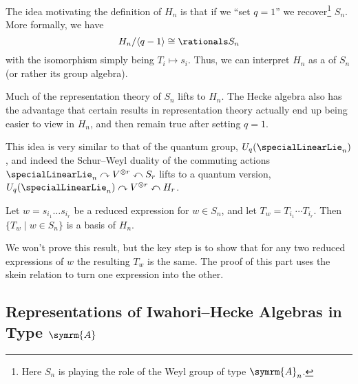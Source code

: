 \documentclass[fleqn]{NotesClass}
\newcommand{\isomorphic}{\cong}
\newcommand{\dynkin}[2]{\symrm{#1}_{#2}}
\begin{document}
    The idea motivating the definition of \(H_n\) is that if we \enquote{set \(q = 1\)} we recover\footnote{Here \(S_n\) is playing the role of the Weyl group of type \(\dynkin{A}{n}\).} \(S_n\).
    More formally, we have
    \begin{equation}
        H_n / \langle q - 1 \rangle \isomorphic \rationals S_n
    \end{equation}
    with the isomorphism simply being \(T_i \mapsto s_i\).
    Thus, we can interpret \(H_n\) as a  of \(S_n\) (or rather its group algebra).
    
    Much of the representation theory of \(S_n\) lifts to \(H_n\).
    The Hecke algebra also has the advantage that certain results in representation theory actually end up being easier to view in \(H_n\), and then remain true after setting \(q = 1\).
    
    This idea is very similar to that of the quantum group, \(U_q(\specialLinearLie_n)\), and indeed the Schur--Weyl duality of the commuting actions \(\specialLinearLie_n \curvearrowright V^{\otimes r} \curvearrowleft S_r\) lifts to a quantum version, \(U_q(\specialLinearLie_n) \curvearrowright V^{\otimes r} \curvearrowleft H_r\).
    
    \begin{prp}{}{}
        Let \(w = s_{i_1} \dotsc s_{i_r}\) be a reduced expression for \(w \in S_n\), and let \(T_w = T_{i_1} \dotsm T_{i_r}\).
        Then \(\{T_w \mid w \in S_n\}\) is a basis of \(H_n\).
    \end{prp}
    
    We won't prove this result, but the key step is to show that for any two reduced expressions of \(w\) the resulting \(T_w\) is the same.
    The proof of this part uses the skein relation to turn one expression into the other.
    
    \subsection{Representations of Iwahori--Hecke Algebras in Type \texorpdfstring{\(\dynkin{A}{{}}\)}{A}}
\end{document}
